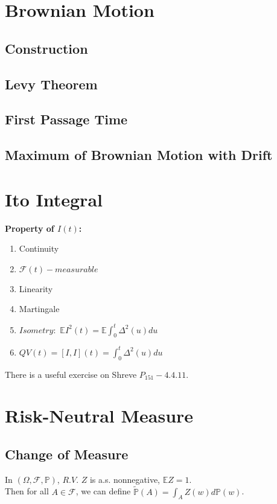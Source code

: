 \documentclass[a4paper, 12pt]{article}
\begin{document}
\section{Brownian Motion}

\subsection{Construction}

\subsection{Levy Theorem}

\subsection{First Passage Time}

\subsection{Maximum of Brownian Motion with Drift}

\section{Ito Integral}
\textbf{Property of $I(t)$: }
\begin{enumerate}
	\item Continuity
	\item $\mathcal{F}(t)-measurable$
	\item Linearity
	\item Martingale
	\item $Isometry:$ $\mathbb{E}I^2(t) = \mathbb{E}\int^t_0{\Delta^2(u) du}$
	\item $QV(t) = [I, I](t) = \int^t_0{\Delta^2(u) du}$ 
\end{enumerate}

\indent There is a useful exercise on Shreve $P_{151} - 4.4.11$.

\section{Risk-Neutral Measure}

\subsection{Change of Measure}
In $(\Omega, \mathcal{F}, \mathbb{P})$, $R.V.$ $Z$ is a.s. nonnegative, $\mathbb{E}Z = 1$.\\
\indent Then for all $A \in \mathcal{F}$, we can define $\widetilde{\mathbb{P}}(A) = \int_A{Z(w)d\mathbb{P}(w)}$.
\end{document}
